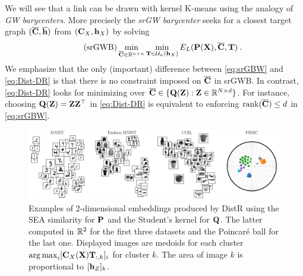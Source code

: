 We will see that a link can be drawn with kernel K-means using the analogy of \emph{GW barycenters}. More precisely the \emph{srGW barycenter} \cite{vincent2021semi} seeks for a closest target graph $(\overline{{\mathbf{C}}}, \overline{{\mathbf{h}}})$ from $({\mathbf{C}}_X, {\mathbf{h}}_X)$ by solving
\begin{equation}\tag{srGWB}\label{eq:srGBW}
	\min_{\overline{{\mathbf{C}}} \in \mathbb{R}^{n \times n}} \min_{{\mathbf{T}} \in \mathcal{U}_n({\mathbf{h}}_X)} E_L({\mathbf{P}}({\mathbf{X}}), \overline{{\mathbf{C}}}, {\mathbf{T}}) \:.
\end{equation} 
We emphasize that the only (important) difference between \cref{eq:srGBW} and
\cref{eq:Dist-DR} is that there is no constraint imposed on $\overline{{\mathbf{C}}}$ in
srGWB. In contrast, \cref{eq:Dist-DR} looks for minimizing over $\overline{{\mathbf{C}}}
\in \{{\mathbf{Q}}({\mathbf{Z}}): {\mathbf{Z}} \in \mathbb{R}^{N \times d}\}$. For instance, choosing ${\mathbf{Q}}({\mathbf{Z}}) = {\mathbf{Z}} {\mathbf{Z}}^\top$ in \cref{eq:Dist-DR} is
equivalent to enforcing $\operatorname{rank}(\overline{{\mathbf{C}}}) \leq d$ in
\cref{eq:srGBW}.
\begin{figure}[t!]
	\begin{center}
		\centerline{\includegraphics[width=\columnwidth]{figures/DistR/DistDR_embed.pdf}}
		\caption{Examples of 2-dimensional embeddings produced by DistR using the SEA similarity for ${\mathbf{P}}$ 
		and the Student's kernel for ${\mathbf{Q}}$. The latter computed in $\mathbb{R}^2$ for the first three datasets and the Poincaré ball for the last one.
		Displayed images are medoids for each cluster \ie $\operatorname*{arg\,max}_i [{\mathbf{C}}_X({\mathbf{X}}){\mathbf{T}}_{:,k}]_i$ for cluster $k$. The area of image $k$ is proportional to $[{\mathbf{h}}_Z]_k$.
		}
		\label{fig:visu_gwdr}
	\end{center}
	\vspace{-0.8cm}
\end{figure}

